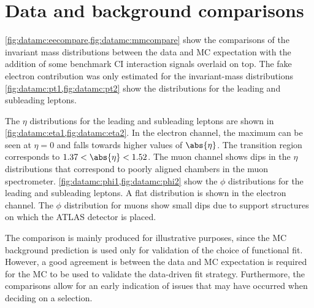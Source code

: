 
\section{Data and background comparisons}\label{sec:datamc:compare}
\cref{fig:datamc:eecompare,fig:datamc:mmcompare} show the comparisons of the invariant mass distributions between the data and MC expectation with the addition of some benchmark CI interaction signals overlaid on top. The fake electron contribution was only estimated for the invariant-mass distributions \cref{fig:datamc:pt1,fig:datamc:pt2} show the \pt distributions for the leading and subleading leptons. 

The $\eta$ distributions for the leading and subleading leptons are shown in \cref{fig:datamc:eta1,fig:datamc:eta2}. In the electron channel, the maximum can be seen at $\eta = 0$ and falls towards higher values of $\abs{\eta}$. The transition region corresponds to $1.37 < \abs{\eta} < 1.52$. The muon channel shows dips in the $\eta$ distributions that correspond to poorly aligned chambers in the muon spectrometer. \cref{fig:datamc:phi1,fig:datamc:phi2} show the $\phi$ distributions for the leading and subleading leptons. A flat distribution is shown in the electron channel. The $\phi$ distribution for muons show small dips due to support structures on which the ATLAS detector is placed. 

The comparison is mainly produced for illustrative purposes, since the MC background prediction is used only for validation of the choice of functional fit. However, a good agreement is between the data and MC expectation is required for the MC to be used to validate the data-driven fit strategy. Furthermore, the comparisons allow for an early indication of issues that may have occurred when deciding on a selection.

